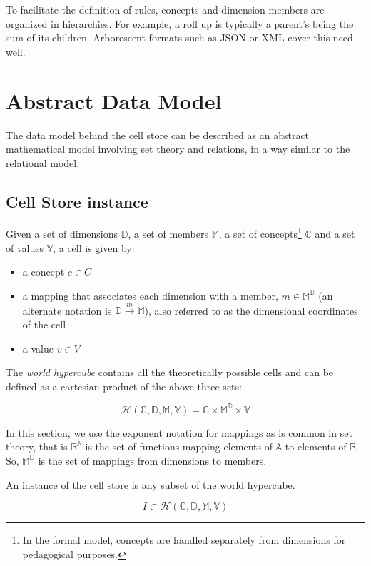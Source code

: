 \documentclass{acm_proc_article-sp}
\begin{document}
To facilitate the definition of rules, concepts and dimension members are organized in hierarchies. For example, a roll up is typically a parent's being the sum of its children. Arborescent formats such as JSON or XML cover this need well.

\section{Abstract Data Model}
\label{section-abstract-data-model}
The data model behind the cell store can be described as an abstract mathematical model involving set theory and relations, in a way similar to the relational model.
\subsection{Cell Store instance}

Given a set of dimensions $\mathbb{D}$, a set of members $\mathbb{M}$, a set of concepts\footnote{In the formal model, concepts are handled separately from dimensions for pedagogical purposes.} $\mathbb{C}$ and a set of values $\mathbb{V}$, a cell is given by:

\begin{itemize}
\item a concept $c \in C$
\item a mapping that associates each dimension with a member, $m \in \mathbb{M}^\mathbb{D}$ (an alternate notation is $\mathbb{D}\stackrel{m}{\longrightarrow}\mathbb{M}$), also referred to as the dimensional coordinates of the cell
\item a value $v \in V$
\end{itemize}

The \emph{world hypercube} contains all the theoretically possible cells and can be defined as a cartesian product of the above three sets:

$$\mathcal{H}(\mathbb{C}, \mathbb{D}, \mathbb{M}, \mathbb{V})=\mathbb{C}\times\mathbb{M}^\mathbb{D}\times\mathbb{V}$$

In this section, we use the exponent notation for mappings as is common in set theory, that is $\mathbb{B}^\mathbb{A}$ is the set of functions mapping elements of $\mathbb{A}$ to elements of $\mathbb{B}$. So, $\mathbb{M}^\mathbb{D}$ is the set of mappings from dimensions to members.

An instance of the cell store is any subset of the world hypercube.

$$I\subset\mathcal{H}(\mathbb{C}, \mathbb{D}, \mathbb{M}, \mathbb{V})$$
\end{document}
